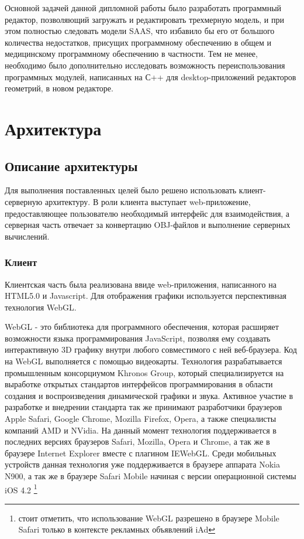\documentclass[12pt, a4paper]{article}
\let\stdsection\section
\renewcommand\section{\newpage\stdsection}
\begin{document}
Основной задачей данной дипломной работы было разработать программный редактор,
позволяющий загружать и редактировать трехмерную модель, и при этом полностью
следовать модели SAAS, что избавило бы его от большого количества недостатков,
присущих программному обеспечению в общем и медицинскому программному
обеспечению в частности. Тем не менее, необходимо было дополнительно исследовать
возможность переиспользования программных модулей, написанных на С++ для
desktop-приложений редакторов геометрий, в новом редакторе.

\section{Архитектура}
\subsection{Описание архитектуры}
Для выполнения поставленных целей было решено использовать клиент-серверную
архитектуру. В роли клиента выступает web-приложение, предоставляющее
пользователю необходимый интерфейс для взаимодействия, а серверная часть
отвечает за конвертацию OBJ-файлов и выполнение серверных вычислений.

\subsubsection{Клиент}
Клиентская часть была реализована ввиде web-приложения, написанного
на HTML5.0 и Javascript. Для отображения графики используется
перспективная технология WebGL.

WebGL - это библиотека для программного обеспечения, которая расширяет
возможности языка программирования JavaScript, позволяя ему создавать
интерактивную 3D графику внутри любого совместимого с ней веб-браузера. Код на
WebGL выполняется с помощью видеокарты. Технология
разрабатывается промышленным консорциумом Khronos Group, который
специализируется на выработке открытых стандартов интерфейсов программирования в
области создания и воспроизведения динамической графики и звука. Активное
участие в разработке и внедрении стандарта так же принимают разработчики
браузеров Apple Safari, Google Chrome, Mozilla Firefox, Opera,  а также
специалисты компаний AMD и NVidia. На данный момент технология поддерживается в
последних версиях браузеров Safari, Mozilla, Opera и Chrome, а так же в браузере
Internet Explorer вместе с плагином IEWebGL. Среди мобильных устройств данная
технология уже поддерживается в браузере аппарата Nokia N900, а так же в
браузере Safari Mobile начиная с версии операционной системы iOS 4.2
\footnote{стоит отметить, что использование WebGL разрешено в браузере Mobile
Safari только в контексте рекламных объявлений iAd}
\end{document}
